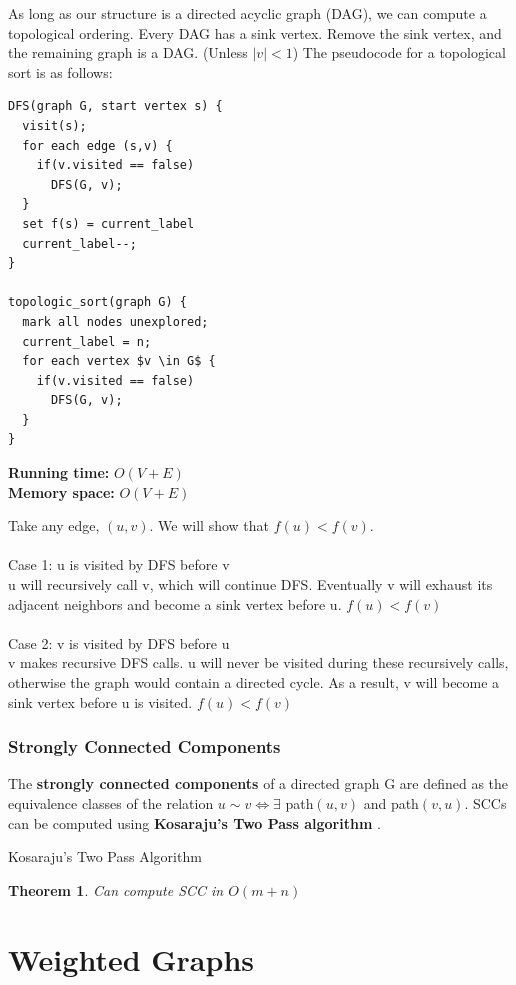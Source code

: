 \documentclass[]{book}
\makeatletter
\renewenvironment{proof}[1][\proofname] {\par\pushQED{\qed}\normalfont\topsep6\p@\@plus6\p@\relax\trivlist\item[\hskip\labelsep\bfseries#1\@addpunct{.}]\ignorespaces}{\popQED\endtrivlist\@endpefalse}
\newcommand{\runtime}[1]{\textbf{Running time:} $O(#1)$\\}
\newcommand{\memory}[1]{\textbf{Memory space:} $O(#1)$\\}
\makeatother
\begin{document}
      As long as our structure is a directed acyclic graph (DAG), we can compute a topological ordering.
      Every DAG has a sink vertex. Remove the sink vertex, and the remaining graph is a DAG. (Unless
      $|v| < 1$) The pseudocode for a topological sort is as follows:
      \begin{Verbatim}
DFS(graph G, start vertex s) {
  visit(s);
  for each edge (s,v) {
    if(v.visited == false)
      DFS(G, v);
  }
  set f(s) = current_label
  current_label--;
}

topologic_sort(graph G) {
  mark all nodes unexplored;
  current_label = n;
  for each vertex $v \in G$ {
    if(v.visited == false)
      DFS(G, v);
  }
}
      \end{Verbatim}
      \runtime{V + E}
      \memory{V + E}
      \begin{proof}
        Take any edge, $(u,v)$. We will show that $f(u) < f(v)$.\\\\
        \indent Case 1: u is visited by DFS before v\\
        u will recursively call v, which will continue DFS. Eventually v will exhaust
        its adjacent neighbors and become a sink vertex before u. $f(u) < f(v)$\\\\
        \indent Case 2: v is visited by DFS before u\\
        v makes recursive DFS calls. u will never be visited during these recursively calls,
        otherwise the graph would contain a directed cycle. As a result, v will become a sink
        vertex before u is visited. $f(u) < f(v)$
      \end{proof}

      \subsection{Strongly Connected Components}
      The \textbf{strongly connected components} of a directed graph G are defined
      as the equivalence classes of the relation $u\sim v \Leftrightarrow \exists$ path$(u,v)$ and
      path$(v,u)$. SCCs can be computed using \textbf{Kosaraju's Two Pass algorithm}
      .

      Kosaraju's Two Pass Algorithm
      \newtheorem{Kosaraju}{Theorem}[section]
      \begin{Kosaraju}
        Can compute SCC in $O(m+n)$
      \end{Kosaraju}
  \chapter{Weighted Graphs}
\end{document}
